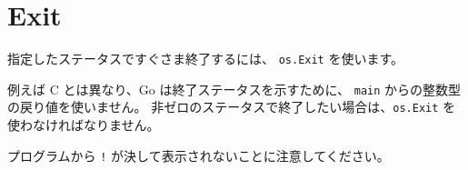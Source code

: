 \section{Exit}

指定したステータスですぐさま終了するには、 \texttt{os.Exit} を使います。



例えば C とは異なり、Go は終了ステータスを示すために、 \texttt{main} からの整数型の戻り値を使いません。 非ゼロのステータスで終了したい場合は、\texttt{os.Exit} を使わなければなりません。



プログラムから \texttt{!} が決して表示されないことに注意してください。